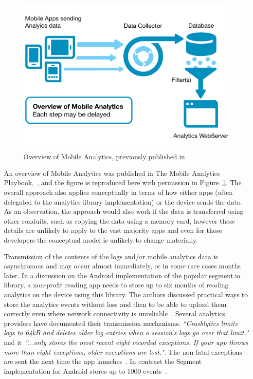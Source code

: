 \begin{figure}
    \includegraphics[width=\linewidth]{images/mobile-analytics-playbook/overview-of-mobile-analytics.pdf}
    \caption[Overview of Mobile Analytics]{Overview of Mobile Analytics, previously published in~\cite{harty_aymer_playbook_2016}}
    \label{fig:map2016-overview-of-mobile-analytics}
\end{figure}

An overview of Mobile Analytics was published in The Mobile Analytics Playbook,~, and the figure is reproduced here with permission in Figure~\ref{fig:map2016-overview-of-mobile-analytics}. The overall approach also applies conceptually in terms of how either apps (often delegated to the analytics library implementation) or the device sends the data. As an observation, the approach would also work if the data is transferred using other conduits, such as copying the data using a memory card, however these details are unlikely to apply to the vast majority apps and even for those developers the conceptual model is unlikely to change materially.

Transmission of the contents of the logs and/or mobile analytics data is asynchronous and may occur almost immediately, or in some rare cases months later. In a discussion on the Android implementation of the popular segment.io library, a non-profit reading app needs to store up to six months of reading analytics on the device using this library. The authors discussed practical ways to store the analytics events without loss and then to be able to upload them correctly even where network connectivity is unreliable~. Several analytics providers have documented their transmission mechanisms. \emph{``Crashlytics limits logs to 64kB and deletes older log entries when a session's logs go over that limit."} and it~\emph{``...only stores the most recent eight recorded exceptions. If your app throws more than eight exceptions, older exceptions are lost."}.  The non-fatal exceptions are sent the next time the app launches~. In contrast the Segment implementation for Android stores up to 1000 events~.


